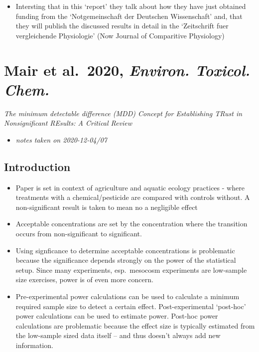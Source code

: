 \documentclass[
]{book}
\providecommand{\tightlist}{%
  \setlength{\itemsep}{0pt}\setlength{\parskip}{0pt}}
\begin{document}
\begin{itemize}
\tightlist
\item
  Intersting that in this `report' they talk about how they have just obtained funding from the `Notgemeinschaft der Deutschen Wissenschaft' and, that they will publish the discussed results in detail in the `Zeitschrift fuer vergleichende Physiologie' (Now Journal of Comparitive Physiology)
\end{itemize}

\hypertarget{mair-et-al.-2020-environ.-toxicol.-chem.}{%
\chapter{\texorpdfstring{Mair et al.~2020, \emph{Environ. Toxicol. Chem.}}{Mair et al.~2020, Environ. Toxicol. Chem.}}\label{mair-et-al.-2020-environ.-toxicol.-chem.}}


\emph{The minimum detectable difference (MDD) Concept for Establishing TRust in Nonsignificant REsults: A Critical Review} \citep{mair2020minimum}

\begin{itemize}
\tightlist
\item
  \emph{notes taken on 2020-12-04/07}
\end{itemize}

\hypertarget{introduction-14}{%
\section{Introduction}\label{introduction-14}}

\begin{itemize}
\tightlist
\item
  Paper is set in context of agriculture and aquatic ecology practices - where treatments with a chemical/pesticide are compared with controls without. A non-significant result is taken to mean no a negligible effect
\item
  Acceptable concentrations are set by the concentration where the transition occurs from non-significant to significant.
\item
  Using signficance to determine acceptable concentrations is problematic because the significance depends strongly on the power of the statistical setup. Since many experiments, esp.~mesocosm experiments are low-sample size exercises, power is of even more concern.
\item
  Pre-experimental power calculations can be used to calculate a minimum required sample size to detect a certain effect. Post-experimental `post-hoc' power calculations can be used to estimate power. Post-hoc power calculations are problematic because the effect size is typically estimated from the low-sample sized data itself -- and thus doesn't always add new information.
\end{itemize}
\end{document}
